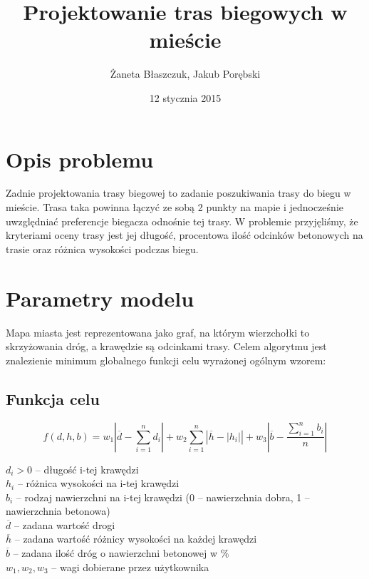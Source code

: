 \documentclass[12pt,a4paper]{article}
\author{Żaneta Błaszczuk, Jakub Porębski}
\title{Projektowanie tras biegowych w mieście}
\date{12 stycznia 2015}
\begin{document}

\tableofcontents
\newpage

\section{Opis problemu}
Zadnie projektowania trasy biegowej to zadanie poszukiwania trasy do biegu w mieście. Trasa taka powinna łączyć ze sobą 2 punkty na mapie i jednocześnie uwzględniać preferencje biegacza odnośnie tej trasy. W problemie przyjęliśmy, że kryteriami oceny trasy jest jej długość, procentowa ilość odcinków betonowych na trasie oraz różnica wysokości podczas biegu.



\section{Parametry modelu}
Mapa miasta jest reprezentowana jako graf, na którym wierzchołki to skrzyżowania dróg, a krawędzie są odcinkami trasy. Celem algorytmu jest znalezienie minimum globalnego funkcji celu wyrażonej ogólnym wzorem:
\subsection{Funkcja celu}

\begin{equation}
	f(d,h,b) = 
	w_1 \left|\overline{d} - \sum\limits_{i=1}^{n} d_{i} \right| + 
	w_2 \sum\limits_{i=1}^{n} \left|\overline{h} -  |h_{i}|\right| + 
	w_3 \left|\overline{b} - \dfrac{\sum\limits_{i=1}^{n} b_{i}}{n} \right|
\end{equation}

$d_i > 0$ -- długość i-tej krawędzi\\
$h_i$ -- różnica wysokości na i-tej krawędzi\\
$b_i$ -- rodzaj nawierzchni na i-tej krawędzi (0 -- nawierzchnia dobra, 1 -- nawierzchnia betonowa)\\
$\overline{d}$ -- zadana wartość drogi\\
$\overline{h}$ -- zadana wartość różnicy wysokości na każdej krawędzi\\
$\overline{b}$ -- zadana ilość dróg o nawierzchni betonowej w \% \\
$w_1, w_2, w_3$ -- wagi dobierane przez użytkownika
\end{document}
